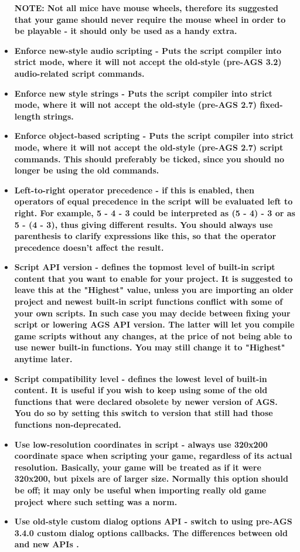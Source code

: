 \begin{itemize}
\bf{NOTE:} Not all mice have mouse wheels, therefore its suggested that your game should never require the mouse wheel in order to
be playable - it should only be used as a handy extra.
\item \bf{Enforce new-style audio scripting} - Puts the script compiler into strict mode,
where it will not accept the old-style (pre-AGS 3.2) audio-related script commands.
\item \bf{Enforce new style strings} - Puts the script compiler into strict mode,
where it will not accept the old-style (pre-AGS 2.7) fixed-length strings.
\item \bf{Enforce object-based scripting} - Puts the script compiler into strict mode,
where it will not accept the old-style (pre-AGS 2.7) script commands. This should
preferably be ticked, since you should no longer be using the old commands.
\item \bf{Left-to-right operator precedence} - if this is enabled, then operators of
equal precedence in the script will be evaluated left to right. For example,
5 - 4 - 3 could be interpreted as  (5 - 4) - 3  or as  5 - (4 - 3), thus giving
different results. You should always use parenthesis to clarify expressions like this,
so that the operator precedence doesn't affect the result.
\item \bf{Script API version} - defines the topmost level of built-in script content
that you want to enable for your project. It is suggested to leave this at the "Highest" value,
unless you are importing an older project and newest built-in script functions conflict with some of your own scripts.
In such case you may decide between fixing your script or lowering AGS API version.
The latter will let you compile game scripts without any changes, at the price of not being able
to use newer built-in functions. You may still change it to "Highest" anytime later.
\item \bf{Script compatibility level} - defines the lowest level of built-in
content. It is useful if you wish to keep using some of the old functions that were declared
obsolete by newer version of AGS. You do so by setting this switch to version that still had
those functions non-deprecated.
\item \bf{Use low-resolution coordinates in script} - always use 320x200 coordinate space when scripting your game, regardless of its actual resolution.
Basically, your game will be treated as if it were 320x200, but pixels are of larger size. Normally this option should be off; it may only be useful when
importing really old game project where such setting was a norm.
\item \bf{Use old-style custom dialog options API} - switch to using pre-AGS 3.4.0 custom dialog options callbacks. The differences between old and new APIs
.
\end{itemize}

